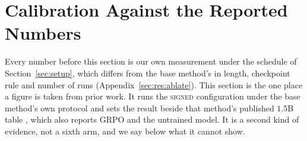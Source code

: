 \documentclass[11pt]{article}
\begin{document}
\section{Calibration Against the Reported Numbers}
\label{sec:reported}

Every number before this section is our own measurement under the schedule of
Section~\ref{sec:setup}, which differs from the base method's in length, checkpoint
rule and number of runs (Appendix~\ref{sec:res:ablate}). This section is the one place
a figure is taken from prior work. It runs the \textsc{signed} configuration under the base method's own
protocol and sets the result beside that method's published $1.5$B table
\citep[Table~12]{steer}, which also reports GRPO and the untrained model. It is a
second kind of evidence, not a sixth arm, and we say below what it cannot show.
\end{document}
